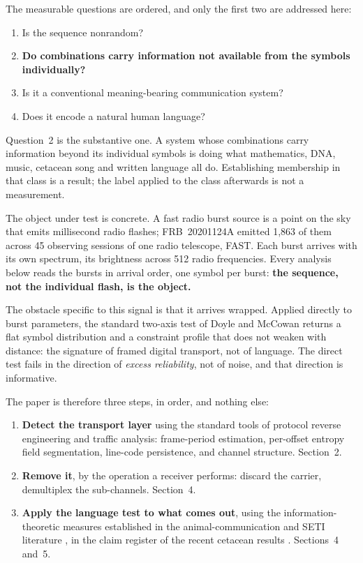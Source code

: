 \documentclass[11pt,a4paper]{article}
\begin{document}
The measurable questions are ordered, and only the first two are addressed here:

\begin{enumerate}[leftmargin=1.6em,itemsep=1pt]
\item Is the sequence nonrandom?
\item \textbf{Do combinations carry information not available from the symbols
individually?}
\item Is it a conventional meaning-bearing communication system?
\item Does it encode a natural human language?
\end{enumerate}

Question~2 is the substantive one. A system whose combinations carry information beyond
its individual symbols is doing what mathematics, DNA, music, cetacean song and written
language all do. Establishing membership in that class is a result; the label applied to
the class afterwards is not a measurement.

The object under test is concrete. A fast radio burst source is a point on the sky
that emits millisecond radio flashes; FRB~20201124A emitted 1{,}863 of them across 45
observing sessions of one radio telescope, FAST. Each burst arrives with its own
spectrum, its brightness across 512 radio frequencies. Every analysis below reads the
bursts in arrival order, one symbol per burst: \textbf{the sequence, not the
individual flash, is the object.}

The obstacle specific to this signal is that it arrives wrapped. Applied directly to
burst parameters, the standard two-axis test of Doyle and McCowan
\cite{mccowan1999,doyle2011} returns a flat symbol distribution and a constraint profile
that does not weaken with distance: the signature of framed digital transport, not of
language. The direct test fails in the direction of \emph{excess reliability}, not of
noise, and that direction is informative.

The paper is therefore three steps, in order, and nothing else:

\begin{enumerate}[leftmargin=1.6em,itemsep=2pt]
\item \textbf{Detect the transport layer} using the standard tools of protocol reverse
engineering and traffic analysis: frame-period estimation, per-offset entropy field
segmentation, line-code persistence, and channel structure. Section~2.
\item \textbf{Remove it}, by the operation a receiver performs: discard the carrier,
demultiplex the sub-channels. Section~4.
\item \textbf{Apply the language test to what comes out}, using the
information-theoretic measures established in the animal-communication and SETI
literature \cite{mccowan1999,doyle2011}, in the claim register of the recent cetacean
results \cite{arnon2025,sharma2024}. Sections~4 and~5.
\end{enumerate}
\end{document}
